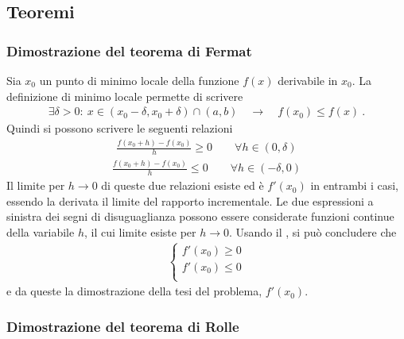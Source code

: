 \documentclass[letterpaper,10pt,italian]{jupyterBook}
\begin{document}
\subsection{Teoremi}
\label{\detokenize{ch/infinitesimal_calculus/derivatives-notes:teoremi}}\label{\detokenize{ch/infinitesimal_calculus/derivatives-notes:infinitesimal-calculus-derivatives-thm-notes}}\label{\detokenize{ch/infinitesimal_calculus/derivatives-notes:infinitesimal-calculus-derivatives-thm-fermat-notes}}\subsubsection*{Dimostrazione del teorema di Fermat}

\sphinxAtStartPar
Sia \(x_0\) un punto di minimo locale della funzione \(f(x)\) derivabile in \(x_0\). La definizione di minimo locale permette di scrivere
\begin{equation*}
\begin{split}\exists \delta > 0: \ x \in (x_0 - \delta, x_0 + \delta) \cap (a,b) \quad \rightarrow \quad f(x_0) \le f(x) \ .\end{split}
\end{equation*}
\sphinxAtStartPar
Quindi si possono scrivere le seguenti relazioni
\begin{equation*}
\begin{split}\frac{f(x_0 + h) - f(x_0)}{h} \ge 0 \qquad \forall h \in (0, \delta)\end{split}
\end{equation*}\begin{equation*}
\begin{split}\frac{f(x_0 + h) - f(x_0)}{h} \le 0 \qquad \forall h \in (-\delta,0)\end{split}
\end{equation*}
\sphinxAtStartPar
Il limite per \(h \rightarrow 0\) di queste due relazioni esiste ed è \(f'(x_0)\) in entrambi i casi, essendo la derivata il limite del rapporto incrementale. Le due espressioni a sinistra dei segni di disuguaglianza possono essere considerate funzioni continue della variabile \(h\), il cui limite esiste per \(h \rightarrow 0\). Usando il {\hyperref[\detokenize{ch/infinitesimal_calculus/analysis:infinitesimal-calculus-continuous-fun-thms-sign}]{}}, si può concludere che
\begin{equation*}
\begin{split}\begin{cases}
  f'(x_0) \ge 0 \\
  f'(x_0) \le 0 \\
\end{cases}\end{split}
\end{equation*}
\sphinxAtStartPar
e da queste la dimostrazione della tesi del problema, \(f'(x_0)\).
\label{\detokenize{ch/infinitesimal_calculus/derivatives-notes:infinitesimal-calculus-derivatives-thm-rolle-notes}}\subsubsection*{Dimostrazione del teorema di Rolle}
\end{document}
